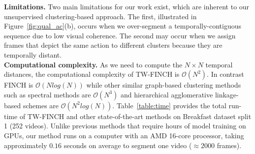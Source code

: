 \documentclass[10pt,twocolumn,letterpaper]{article}
\begin{document}
\noindent\textbf{Limitations.} Two main limitations for our work exist, which are inherent to our unsupervised clustering-based approach. The first, illustrated in Figure~\ref{fig:qual_ac}(b), occurs when we over-segment a temporally-contiguous sequence due to low visual coherence. 
The second may occur when we assign frames that depict the same action to different clusters because they are temporally distant.\\


\noindent\textbf{Computational complexity.} As we need to compute the $N \times N$ temporal distances, the computational complexity of TW-FINCH is $\mathcal{O}(N^2)$. In contrast FINCH is $\mathcal{O}(Nlog(N))$ while other similar graph-based clustering methods such as spectral methods are $\mathcal{O}(N^3)$ and hierarchical agglomerative linkage-based schemes are $\mathcal{O}(N^2log(N))$.
Table~\ref{table:time} provides the total run-time of TW-FINCH and other state-of-the-art methods on Breakfast dataset split 1 (252 videos). Unlike previous methods that require hours of model training on GPUs, our method runs on a computer with an AMD 16-core processor, taking approximately $0.16$ seconds on average to segment one video ($\approx2000$ frames).




\begin{table}[t!]
\centering
{}
\caption{ Run-time comparison of method with other state-of-the-art methods on Breakfast dataset. 
Testing duration is measured as the average inference for split 1 test
set (252 videos).  $^{\star}$The run-time of all the {\color{blue}{Weakly Sup.}} methods were taken from~\cite{mucon}   \label{table:time}}
\vspace{-0.3cm}

\end{table}
\end{document}
